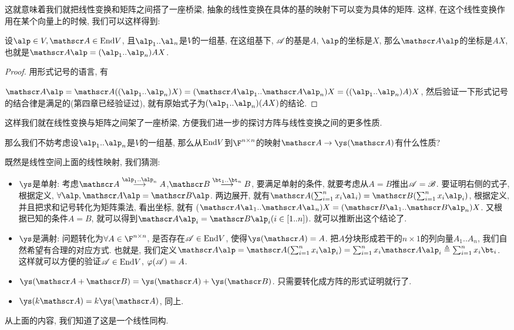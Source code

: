 这就意味着我们就把线性变换和矩阵之间搭了一座桥梁, 抽象的线性变换在具体的基的映射下可以变为具体的矩阵. 这样, 在这个线性变换作用在某个向量上的时候,
我们可以这样得到: 
\begin{thm}
设$\alp\in V,\huat A\in\End V$, 且$\alp_{1}..\al_{n}$是$V$的一组基, 在这组基下,
$\mathscr{A}$的基是$A$, $\alp$的坐标是$X$, 那么$\huat A\alp$的坐标是$AX$, 也就是$\huat A\alp=(\alp_{1}..\alp_{n})AX$.
\end{thm}
\begin{proof}
用形式记号的语言, 有

$\huat A\alp=\huat A((\alp_{1}..\alp_{n})X)=(\huat A\alp_{1}..\huat A\alp_{n})X=((\alp_{1}..\alp_{n})A)X$,
然后验证一下形式记号的结合律是满足的(第四章已经验证过), 就有原始式子为$(\alp_{1}..\alp_{n})(AX)$的结论. 
\end{proof}
这样我们就在线性变换与矩阵之间架了一座桥梁, 方便我们进一步的探讨方阵与线性变换之间的更多性质.

那么我们不妨考虑设$\alp_{1}..\alp_{n}$是$V$的一组基, 那么从$\text{End} V$到$\F^{n\times n}$的映射$\huat A\to\text{\ensuremath{\ys(}\ensuremath{\huat A})}$有什么性质?

既然是线性空间上面的线性映射, 我们猜测: 
\begin{itemize}
\item $\ys$是单射: 考虑$\huaa\stackrel{\alp_{1}..\alp_{n}}{\longrightarrow}A$,$\huab\stackrel{\bt_{1}..\bt_{n}}{\longrightarrow}B$,
要满足单射的条件, 就要考虑从$A=B$推出$\mathscr{A}=\mathscr{B}$. 要证明右侧的式子, 根据定义, $\forall\alp,\huaa\alp=\huab\alp$.
两边展开, 就有$\huaa(\sum_{i=1}^{n}x_{i}\al_{i})=\huab(\sum_{i=1}^{n}x_{i}\alp_{i})$,
根据定义, 并且把求和记号转化为矩阵乘法, 看出坐标, 就有 ($\huaa\al_{1}..\huaa\al_{n})X=(\huab\al_{1}..\huab\alp_{n})X$.
又根据已知的条件$A=B$, 就可以得到$\huaa\alp_{i}=\huab\alp_{i}(i\in[1..n])$. 就可以推断出这个结论了. 
\item $\ys$是满射: 问题转化为$\forall A\in\F^{n\times n}$, 是否存在$\mathscr{A}\in\text{End} V$,
使得$\ys(\huaa)=A$. 把$A$分块形成若干的$n\times1$的列向量$A_{1}..A_{n}$, 我们自然希望有合理的对应方式.
也就是, 我们定义$\huaa\alp=\huaa(\sum_{i=1}^{n}x_{i}\alp_{i})=\sum_{i=1}^{n}x_{i}\huaa\alp_{i}\triangleq\sum_{i=1}^{n}x_{i}\bt_{i}$.
这样就可以方便的验证$\mathscr{A}\in\text{End} V$, $\varphi(\mathscr{A})=A$. 
\item $\ys(\huat A+\huab)=\ys(\huaa)+\ys(\huab)$. 只需要转化成方阵的形式证明就行了. 
\item $\ys(k\huaa)=k\ys(\huaa)$, 同上. 
\end{itemize}
从上面的内容, 我们知道了这是一个线性同构.

